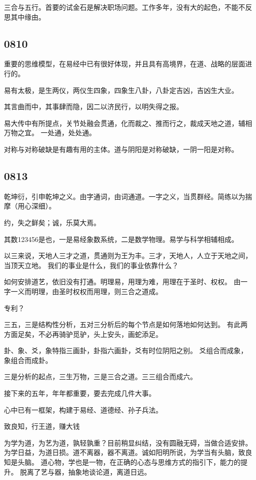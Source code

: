 三合与五行。首要的试金石是解决职场问题。工作多年，没有大的起色，不能不反思其中缘由。

\subsection{0810}

重要的思维模型，在易经中已有很好体现，并且具有高境界，在道、战略的层面进行的。

易有太极，是生两仪，两仪生四象，四象生八卦，八卦定吉凶，吉凶生大业。

其言曲而中，其事肆而隐，因二以济民行，以明失得之报。

易大传中有所提点，关节处融会贯通，化而裁之、推而行之，裁成天地之道，辅相万物之宜。
一处通，处处通。

对称与对称破缺是有趣有用的主体。道与阴阳是对称破缺，一阴一阳是对称。

\subsection{0813}

乾坤衍，引申乾坤之义。由字通词，由词通道。一字之义，当贯群经。简练以为揣摩（用心深细）。

约，失之鲜矣；诚，乐莫大焉。

其数123456是也，一是易经象数系统，二是数学物理。易学与科学相辅相成。

以三来说，天地人三才之道，贯通则为王为丰。三才，天地人，人立于天地之间，当顶天立地。
我们的事业是什么，我们的事业依靠什么？

如何安排道艺，依旧没有打通。明理易，用理为难，用理在于圣时、权权。
由一字一义而明理，由圣时权权而用理，则三合之道成。

专利？

三五，三是结构性分析，五对三分析后的每个节点是如何落地如何达到。
有此两方面足矣，不必再骑驴觅驴，头上安头，画蛇添足。

卦、象、爻，象特指三画卦，卦指六画卦，爻有时位阴阳之别。
爻组合而成象，象组合而成卦。

三是分析的起点，三生万物，三是三合之道。三三组合而成六。

接下来的五年，年年都重要，要去完成几件大事。

心中已有一框架，构建于易经、道德经、孙子兵法。

致良知，行王道，赚大钱

为学为道，为艺为道，孰轻孰重？目前稍显纠结，没有圆融无碍，当做合适安排。
为学日益，为道日损。道不离器，器不离道。诚如阳明所说，为学当有头脑，致良知是头脑。
道心物，学也是一物，在正确的心态与思维方式的指引下，能力的提升。
脱离了艺与器，抽象地谈论道，离道日远。

